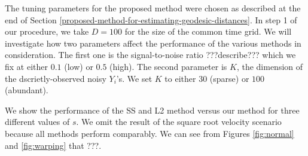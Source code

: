 The tuning parameters for the proposed method were chosen as described
at the end of Section
\ref{proposed-method-for-estimating-geodesic-distances}. In step 1 of
our procedure, we take \(D = 100\) for the size of the common time grid.
We will investigate how two parameters affect the performance of the
various methods in consideration. The first one is the signal-to-noise
ratio ???describe??? which we fix at either \(0.1\) (low) or \(0.5\)
(high). The second parameter is \(K\), the dimension of the
dscrietly-observed noisy \(Y_i\)'s. We set \(K\) to either \(30\)
(sparse) or \(100\) (abundant).

We show the performance of the SS and L2 method versus our method for
three different values of \(s\). We omit the result of the square root
velocity scenario because all methods perform comparably. We can see
from Figures \ref{fig:normal} and \ref{fig:warping} that ???.

